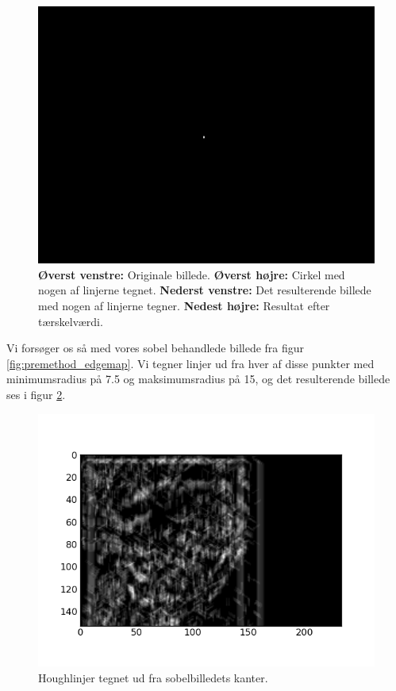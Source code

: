 \begin{figure}[H]
\begin{minipage}[b]{0.5\linewidth}
	\end{minipage}
	\hspace{0.5cm}
	\begin{minipage}[b]{0.5\linewidth}
		\centering
		\includegraphics[scale=1.5]{files/premethod/img/dirmap4.png}
	\end{minipage}
	\caption{\textbf{Øverst venstre:} Originale billede. \textbf{Øverst højre:} Cirkel med nogen af linjerne tegnet. \textbf{Nederst venstre:} Det resulterende billede med nogen af linjerne tegner. \textbf{Nedest højre:} Resultat efter tærskelværdi.\label{fig:premethod_houghres}}
\end{figure}

Vi forsøger os så med vores sobel behandlede billede fra figur \ref{fig:premethod_edgemap}. Vi tegner linjer ud fra hver af disse punkter med minimumsradius på 7.5 og maksimumsradius på 15, og det resulterende billede ses i figur \ref{fig:premethod_houghCellLines}. 

\begin{figure}[H]
	\centering
	\includegraphics[scale=0.8]{files/premethod/img/houghCell.png}
	\caption{Houghlinjer tegnet ud fra sobelbilledets kanter.\label{fig:premethod_houghCellLines}}
\end{figure}

